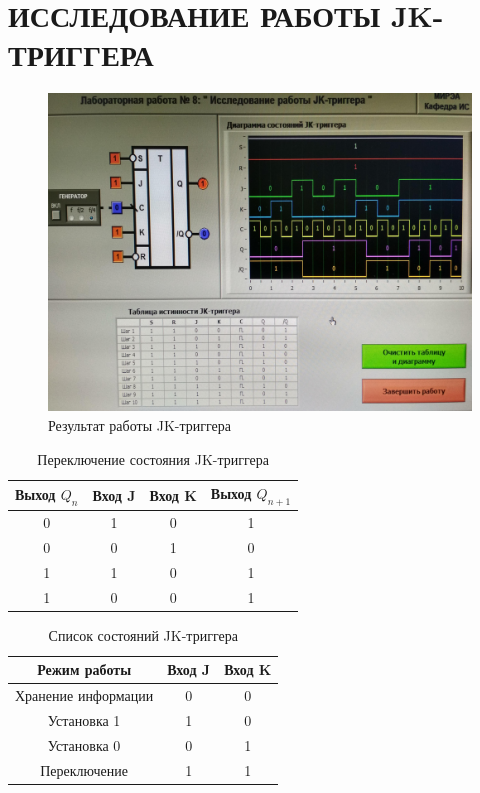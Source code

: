 \section{ИССЛЕДОВАНИЕ РАБОТЫ JK-ТРИГГЕРА}

\begin{figure}[H]
	\centering
	\includegraphics[width=0.95\linewidth]{imgs/8/1}
	\caption{Результат работы JK-триггера}
	\label{fig:8_1}
\end{figure}

\begin{table}[H]
	\centering
	\caption{Переключение состояния JK-триггера}
	\label{tab:lab_08_states}
	\begin{tabular}{|c|c|c|c|}
		\hline
		Выход $Q_n$ & Вход J   & Вход K   & Выход $Q_{n+1}$ \\ \hline
		0           & 1        & 0        & 1               \\ \hline
		0           & 0        & 1        & 0               \\ \hline
		1           & 1        & 0        & 1               \\ \hline
		1           & 0        & 0        & 1               \\ \hline
	\end{tabular}
\end{table}

\begin{table}[H]
	\centering
	\caption{Список состояний JK-триггера}
	\label{tab:lab_08_mode}
	\begin{tabular}{|c|c|c|}
		\hline
		Режим работы        & Вход J & Вход K \\ \hline
		Хранение информации & 0      & 0      \\ \hline
		Установка 1         & 1      & 0      \\ \hline
		Установка 0         & 0      & 1      \\ \hline
		Переключение        & 1      & 1      \\ \hline
	\end{tabular}
\end{table}

